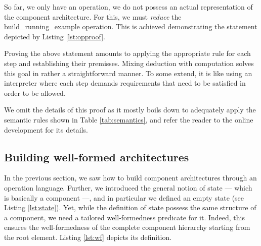 	
			
	
	
	\noindent So far, we only have an \textsf{operation}, we do not possess an actual representation of the
	\textsf{component} architecture. For this, we must \textit{reduce} the \textsf{build\_running\_example} \textsf{operation}. 
	This is achieved demonstrating the statement depicted by Listing 
	\ref{lst:opproof}. 
		
			
	
	
	Proving the above statement amounts to applying the appropriate
  rule for each step and establishing their premisses. Mixing
  deduction with computation solves this goal in
  rather a straightforward manner. To some extend, it is like
  using an interpreter where each step demands
  requirements that need to be satisfied in order to
  be allowed. 	
  
	We omit the details of this proof	 as it mostly boils down to adequately apply the semantic
   rules shown in Table \ref{tab:semantics}, and refer the reader to the online development for its details.
   	
 

\subsection{Building well-formed architectures} 
\label{sub:valid}


		In the previous section, we saw how to build \textsf{component} architectures through an \textsf{operation}
	language. Further, we introduced the general notion of \textsf{state} --- which is basically a \textsf{component} ---, 
	and in particular we defined an empty \textsf{state} (see Listing \ref{lst:state}). Yet, while the definition of \textsf{state}
	possess the same structure of a \textsf{component}, we need a tailored well-formedness predicate for it. Indeed,
	this ensures the well-formedness of the complete \textsf{component} hierarchy starting from the root element.
	Listing \ref{lst:wf} depicts its definition.	
		
  		
	
